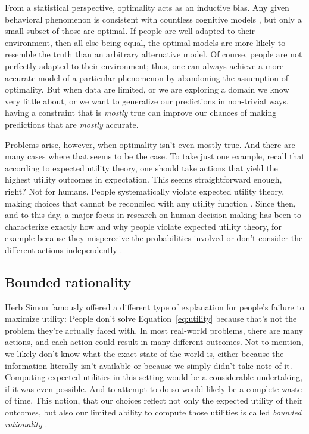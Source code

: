 From a statistical perspective, optimality acts as an inductive bias. Any given behavioral phenomenon is consistent with countless cognitive models \citep{anderson1978arguments}, but only a small subset of those are optimal. If people are well-adapted to their environment, then all else being equal, the optimal models are more likely to resemble the truth than an arbitrary alternative model. Of course, people are not perfectly adapted to their environment; thus, one can always achieve a more accurate model of a particular phenomenon by abandoning the assumption of optimality. But when data are limited, or we are exploring a domain we know very little about, or we want to generalize our predictions in non-trivial ways, having a constraint that is \emph{mostly} true can improve our chances of making predictions that are \emph{mostly} accurate.

Problems arise, however, when optimality isn't even mostly true. And there are many cases where that seems to be the case. To take just one example, recall that according to expected utility theory, one should take actions that yield the highest utility outcomes in expectation. This seems straightforward enough, right? Not for humans. People systematically violate expected utility theory, making choices that cannot be reconciled with any utility function \citep{allais1953comportement,ellsberg1961risk,kahneman1979prospect}. Since then, and to this day, a major focus in research on human decision-making has been to characterize exactly how and why people violate expected utility theory, for example because they misperceive the probabilities involved \citep{kahneman1979prospect} or don't consider the different actions independently \citep{roe2001multialternative}.

\subsection{Bounded rationality}

Herb Simon \citeyearpar{simon1955behavioral} famously offered a different type of explanation for people's failure to maximize utility: People don't solve Equation~\ref{eq:utility} because that's not the problem they're actually faced with. In most real-world problems, there are many actions, and each action could result in many different outcomes. Not to mention, we likely don't know what the exact state of the world is, either because the information literally isn't available or because we simply didn't take note of it. Computing expected utilities in this setting would be a considerable undertaking, if it was even possible. And to attempt to do so would likely be a complete waste of time. This notion, that our choices reflect not only the expected utility of their outcomes, but also our limited ability to compute those utilities is called \emph{bounded rationality} \citep{simon1990bounded}.


